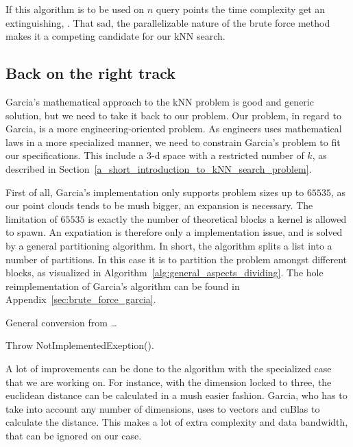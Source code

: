 If this algorithm is to be used on $n$ query points the time complexity get an extinguishing, . That sad, the parallelizable nature of the brute force method makes it a competing candidate for our kNN search.


\subsection{Back on the right track} %
\label{sub:back_on_the_right_rrack}


Garcia's mathematical approach to the kNN problem is good and generic solution, but we need to take it back to our problem. Our problem, in regard to Garcia, is a more engineering-oriented problem. As engineers uses mathematical laws in a more specialized manner, we need to constrain Garcia's problem to fit our specifications. This include a 3-d space with a restricted number of $k$, as described in Section~\ref{a_short_introduction_to_kNN_search_problem}.



First of all, Garcia's implementation only supports problem sizes up to $65535$, as our point clouds tends to be mush bigger, an expansion is necessary. The limitation of $65535$ is exactly the number of theoretical blocks a kernel is allowed to spawn. An expatiation is therefore only a implementation issue, and is solved by a general partitioning algorithm. In short, the algorithm splits a list into a number of partitions. In this case it is to partition the problem amongst different blocks, as visualized in Algorithm~\ref{alg:general_aspects_dividing}. The hole reimplementation of Garcia's algorithm can be found in Appendix~\ref{sec:brute_force_garcia}.

\begin{algorithm}[ht]
\caption{General conversion from \dots}
\label{alg:general_aspects_dividing}
\begin{algorithmic}
    \State Throw NotImplementedExeption().
\end{algorithmic}
\end{algorithm}


A lot of improvements can be done to the algorithm with the specialized case that we are working on. For instance, with the dimension locked to three, the euclidean distance can be calculated in a mush easier fashion. Garcia, who has to take into account any number of dimensions, uses to vectors and cuBlas to calculate the distance. This makes a lot of extra complexity and data bandwidth, that can be ignored on our case.


